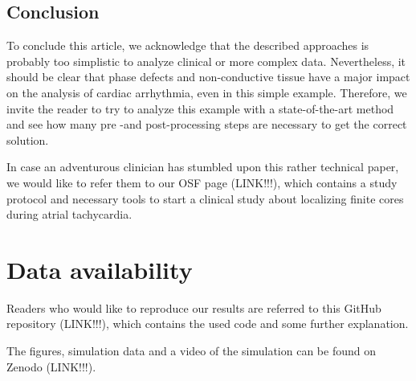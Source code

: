 \documentclass[twocolumn]{article}
\begin{document}
\subsection{Conclusion}

To conclude this article,
we acknowledge that the described approaches is probably too simplistic
to analyze clinical or more complex data.
Nevertheless, it should be clear
that phase defects and non-conductive tissue have a major impact
on the analysis of cardiac arrhythmia, even in this simple example.
Therefore, we invite the reader to try to analyze this example with a state-of-the-art method
and see how many pre -and post-processing steps are necessary to get the correct solution.

In case an adventurous clinician has stumbled upon this rather technical paper,
we would like to refer them to our OSF page (LINK!!!),
which contains a study protocol and necessary tools
to start a clinical study about localizing finite cores during atrial tachycardia.

\section{Data availability}

Readers who would like to reproduce our results are referred to this
GitHub repository (LINK!!!), which contains the used code and some
further explanation.

\noindent The figures, simulation data and a video of the simulation can be found on Zenodo (LINK!!!).

\printbibliography
\end{document}

